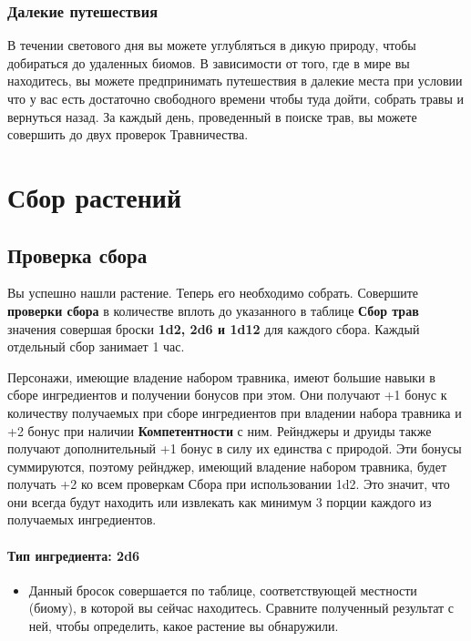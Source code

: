 \documentclass[a4paper, 9pt, twocolumn]{book}
\begin{document}
	\subsubsection*{Далекие путешествия}
	
	В течении светового дня вы можете углубляться в дикую природу, чтобы добираться до удаленных биомов. В зависимости от того, где в мире вы находитесь, вы можете предпринимать путешествия в далекие места при условии что у вас есть достаточно свободного времени чтобы туда дойти, собрать травы и вернуться назад. За каждый день, проведенный в поиске трав, вы можете совершить до двух проверок Травничества.
	
	\section{Сбор растений}
	
	\subsection{Проверка сбора}
	
	Вы успешно нашли растение. Теперь его необходимо собрать. Совершите \textbf{проверки сбора} в количестве вплоть до указанного в таблице \textbf{Сбор трав} значения совершая броски \textbf{1d2, 2d6 и 1d12} для каждого сбора. Каждый отдельный сбор занимает 1 час.
	
	Персонажи, имеющие владение набором травника, имеют большие навыки в сборе ингредиентов и получении бонусов при этом. Они получают +1 бонус к количеству получаемых при сборе ингредиентов при владении набора травника и +2 бонус при наличии \textbf{Компетентности} с ним. Рейнджеры и друиды также получают дополнительный +1 бонус в силу их единства с природой. Эти бонусы суммируются, поэтому рейнджер, имеющий владение набором травника, будет получать +2 ко всем проверкам Сбора при использовании 1d2. Это значит, что они всегда будут находить или извлекать как минимум 3 порции каждого из получаемых ингредиентов.
	
	\paragraph*{Тип ингредиента: 2d6}
	\noindent
	\begin{itemize}
		\item Данный бросок совершается по таблице, соответствующей местности (биому), в которой вы сейчас находитесь. Сравните полученный результат с ней, чтобы определить, какое растение вы обнаружили.
	\end{itemize}
	
\end{document}
